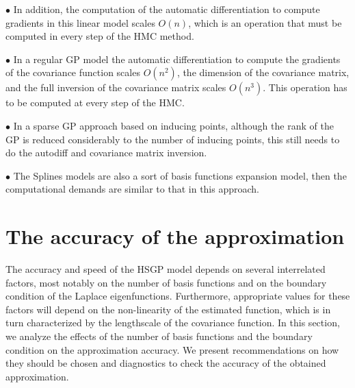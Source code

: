 \documentclass[]{interact}
\theoremstyle{plain}%
\theoremstyle{definition}
\theoremstyle{remark}
\begin{document}
\vspace{2mm}
$\bullet$ In addition, the computation of the automatic differentiation to compute gradients in this linear model scales $O(n)$, which is an operation that must be computed in every step of the HMC method.

\vspace{2mm}
$\bullet$ In a regular GP model the automatic differentiation to compute the gradients of the covariance function scales $O(n^2)$, the dimension of the covariance matrix, and the full inversion of the covariance matrix scales $O(n^3)$. This operation has to be computed at every step of the HMC.

\vspace{2mm}
$\bullet$ In a sparse GP approach based on inducing points, although the rank of the GP is reduced considerably to the number of inducing points, this still needs to do the autodiff and covariance matrix inversion.

\vspace{2mm}
$\bullet$ The Splines models are also a sort of basis functions expansion model, then the computational demands are similar to that in this approach.


\section{The accuracy of the approximation}

The accuracy and speed of the HSGP model depends on several interrelated factors, most notably on the number of basis functions and on the boundary condition of the Laplace eigenfunctions. Furthermore, appropriate values for these factors will depend on the non-linearity of the estimated function, which is in turn characterized by the lengthscale of the covariance function.
In this section, we analyze the effects of the number of basis functions and the boundary condition on the approximation accuracy. We present recommendations on how they should be chosen and diagnostics to check the accuracy of the obtained approximation.


\end{document}
